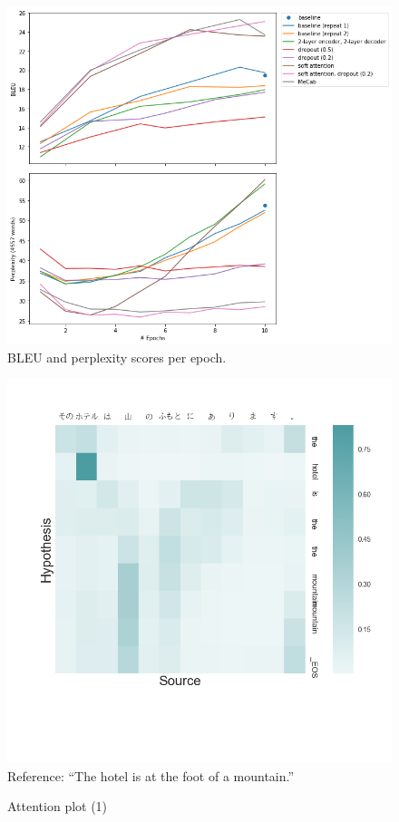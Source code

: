 \documentclass[answers]{exam}
\begin{document}
\begin{CJK}{UTF8}{min}
\begin{figure}
  \centering
  \includegraphics[width=\linewidth]{fig-bleu-pplx}
  \caption{BLEU and perplexity scores per epoch.}
  \label{fig:bleu-pplx}
\end{figure}

\begin{figure}
  \centering
  \includegraphics[width=\linewidth]{fig-plot-1}
  Reference: ``The hotel is at the foot of a mountain.''
  \caption{Attention plot (1)}
  \label{fig:plot-1}
\end{figure}


\end{CJK}
\end{document}

